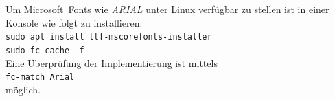 \renewcommand*{\authorOfNextLines}{Helmut Quinz}
Um Microsoft\textcopyright ~Fonts wie \emph{ARIAL} unter Linux verfügbar zu stellen ist in einer Konsole wie folgt zu installieren:\\
\texttt{sudo apt install ttf-mscorefonts-installer}\\
\texttt{sudo fc-cache -f}\\

Eine Überprüfung der Implementierung ist mittels\\
\texttt{fc-match Arial}\\
möglich.